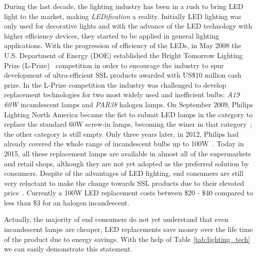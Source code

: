 During the last decade, the lighting industry has been in a rush to bring LED light to the market, making \emph{LEDification} a reality. Initially LED lighting was only used for decorative lights and with the advance of the LED technology with higher efficiency devices, they started to be applied in general lighting applications. With the progression of efficiency of the LEDs, in May 2008 the U.S. Department of Energy (DOE) established the Bright Tomorrow Lighting Prize (L-Prize)~\cite{web:LPrize,09Taub} competition in order to encourage the industry to spur development of ultra-efficient SSL products awarded with US\$10 million cash prize. In the L-Prize competition the industry was challenged to develop replacement technologies for two most widely used and inefficient bulbs: \emph{A19 60W} incandescent lamps and \emph{PAR38} halogen lamps. On September 2009, Philips Lighting North America became the fist to submit LED lamps in the category to replace the standard 60W screw-in lamps, becoming the winer in that category~\cite{web:Winer-LPrize,web:Wright}; the other category is still empty. Only three years later, in 2012, Philips had already covered the whole range of incandescent bulbs up to 100W~\cite{13liedenbaum}. Today in 2015, all these replacement lamps are available in almost all of the supermarkets and retail shops, although they are not yet adopted as the preferred solution by consumers. Despite of the advantages of LED lighting, end consumers are still very reluctant to make the change towards SSL products due to their elevated price~\cite{11Voger,15Greig}. Currently a 100W LED replacement costs between \$20 - \$40 compared to less than \$3 for an halogen incandescent.

Actually, the majority of end consumers do not yet understand that even incandescent lamps are cheaper, LED replacements save money over the life time of the product due to energy savings. With the help of Table \ref{tab:lighting_tech} we can easily demonstrate this  statement.

